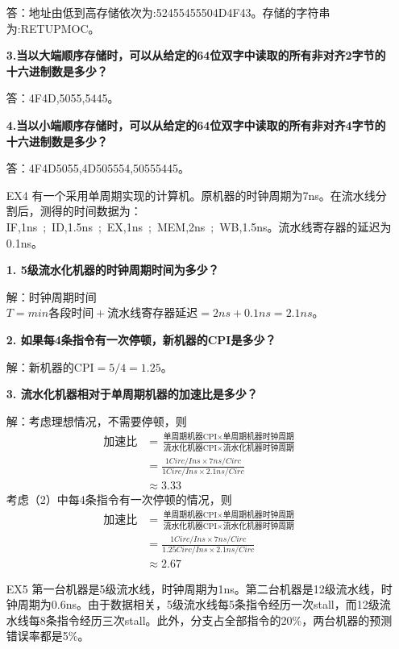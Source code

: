 \documentclass[12pt,a4paper,utf8]{ctexart}
\begin{document}
\begin{enumerate}
答：地址由低到高存储依次为:52455455504D4F43。存储的字符串为:RETUPMOC。

\textbf{3.当以大端顺序存储时，可以从给定的64位双字中读取的所有非对齐2字节的十六进制数是多少？}

答：4F4D,5055,5445。

\textbf{4.当以小端顺序存储时，可以从给定的64位双字中读取的所有非对齐4字节的十六进制数是多少？}

答：4F4D5055,4D505554,50555445。

\item[EX4] %
有一个采用单周期实现的计算机。原机器的时钟周期为7ns。在流水线分割后，测得的时间数据为：IF,1ns\ ;\ ID,1.5ns\ ;\ EX,1ns\ ;\ MEM,2ns\ ;\ WB,1.5ns。流水线寄存器的延迟为0.1ns。

\textbf{1. 5级流水化机器的时钟周期时间为多少？}

解：时钟周期时间$ T = min{\mbox{各段时间}} + \mbox{流水线寄存器延迟}  = 2ns + 0.1ns = 2.1ns$。

\textbf{2. 如果每4条指令有一次停顿，新机器的CPI是多少？}

解：新机器的CPI$  = 5 / 4 = 1.25 $。

\textbf{3. 流水化机器相对于单周期机器的加速比是多少？}

解：考虑理想情况，不需要停顿，则
\begin{equation}
	\begin{aligned}
		\mbox{加速比} &= \frac {\mbox{单周期机器CPI} \times \mbox{单周期机器时钟周期}}{\mbox{流水化机器CPI} \times  \mbox{流水化机器时钟周期}} \\
		&= \frac{1 Circ/Ins \times 7ns/Circ}{1 Circ/Ins \times 2.1ns/Circ} \\
		& \approx 3.33
	\end{aligned}\nonumber
\end{equation}
考虑（2）中每4条指令有一次停顿的情况，则
\begin{equation}
	\begin{aligned}
		\mbox{加速比} &= \frac {\mbox{单周期机器CPI} \times \mbox{单周期机器时钟周期}}{\mbox{流水化机器CPI} \times  \mbox{流水化机器时钟周期}} \\
		&= \frac{1 Circ/Ins \times 7ns/Circ}{1.25 Circ/Ins \times 2.1ns/Circ} \\
		&\approx 2.67
	\end{aligned}\nonumber
\end{equation}

\item[EX5] %
第一台机器是5级流水线，时钟周期为1ns。第二台机器是12级流水线，时钟周期为0.6ns。由于数据相关，5级流水线每5条指令经历一次stall，而12级流水线每8条指令经历三次stall。此外，分支占全部指令的20\%，两台机器的预测错误率都是5\%。
                          

\end{enumerate}
\end{document}
